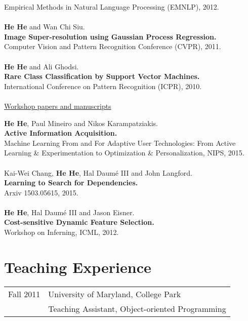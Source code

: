 \documentclass[a4paper,11pt]{article}
\begin{document}
Empirical Methods in Natural Language Processing (EMNLP), 2012.\\
\\
{\bf He He} and Wan Chi Siu. \\
{\bf Image Super-resolution using Gaussian Process Regression.}\\
Computer Vision and Pattern Recognition Conference (CVPR), 2011.\\
\\
{\bf He He} and Ali Ghodsi. \\
{\bf Rare Class Classification by Support Vector Machines.}\\
International Conference on Pattern Recognition (ICPR), 2010.\\
\\
{\underline{Workshop papers and manuscripts}}

{\bf He He}, Paul Mineiro and Nikos Karampatziakis. \\
{\bf Active Information Acquisition.}\\
Machine Learning From and For Adaptive User Technologies: From Active Learning \& Experimentation to Optimization \& Personalization, NIPS, 2015.\\
\\
Kai-Wei Chang, {\bf He He}, Hal Daum\'e III and John Langford.\\
{\bf Learning to Search for Dependencies.}\\
Arxiv 1503.05615, 2015.\\
\\
{\bf He He}, Hal Daum\'e III and Jason Eisner.\\
{\bf Cost-sensitive Dynamic Feature Selection.}\\
Workshop on Inferning, ICML, 2012.

\section{Teaching Experience} 
\begin{tabular}{rl}
Fall 2011 & University of Maryland, College Park\\
& Teaching Assistant, Object-oriented Programming
\end{tabular}
\end{document}
